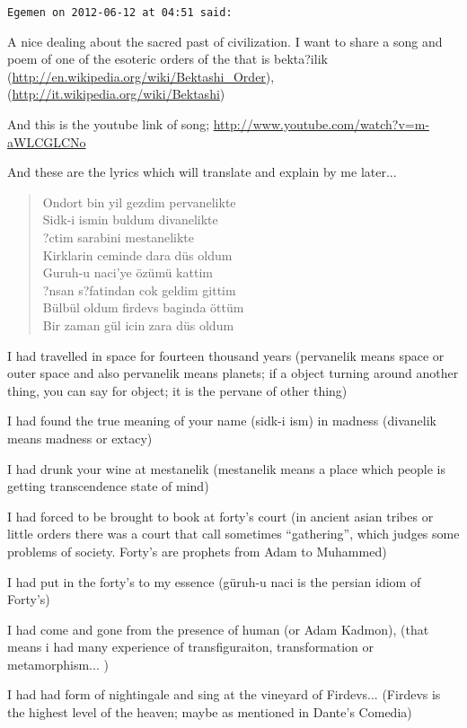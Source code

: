 \begin{footnotesize}
\begin{sffamily}
\texttt{Egemen on 2012-06-12 at 04:51 said:}

A nice dealing about the sacred past of civilization. I want to share a song and poem of one of the esoteric orders of the that is bekta?ilik (\url{http://en.wikipedia.org/wiki/Bektashi\_Order}), (\url{http://it.wikipedia.org/wiki/Bektashi})


And this is the youtube link of song;
\url{http://www.youtube.com/watch?v=m-aWLCGLCNo}

And these are the lyrics which will translate and explain by me later... 
\begin{verse}
Ondort bin yil gezdim pervanelikte\\
Sidk-i ismin buldum divanelikte\\
?ctim sarabini mestanelikte\\
Kirklarin ceminde dara düs oldum\\
Guruh-u naci'ye özümü kattim\\
?nsan s?fatindan cok geldim gittim\\
Bülbül oldum firdevs baginda öttüm\\
Bir zaman gül icin zara düs oldum
\end{verse}

I had travelled in space for fourteen thousand years (pervanelik means space or outer space and also pervanelik means planets; if a object turning around another thing, you can say for object; it is the pervane of other thing)

I had found the true meaning of your name (sidk-i ism) in madness (divanelik means madness or extacy)

I had drunk your wine at mestanelik (mestanelik means a place which people is getting transcendence state of mind)

I had forced to be brought to book at forty's court (in ancient asian tribes or little orders there was a court that call sometimes ``gathering'', which judges some problems of society. Forty's are prophets from Adam to Muhammed)

I had put in the forty's to my essence (güruh-u naci is the persian idiom of Forty's)

I had come and gone from the presence of human (or Adam Kadmon), (that means i had many experience of transfiguraiton, transformation or metamorphism... )

I had had form of nightingale and sing at the vineyard of Firdevs... (Firdevs is the highest level of the heaven; maybe as mentioned in Dante's Comedia)


\end{sffamily}
\end{footnotesize}
